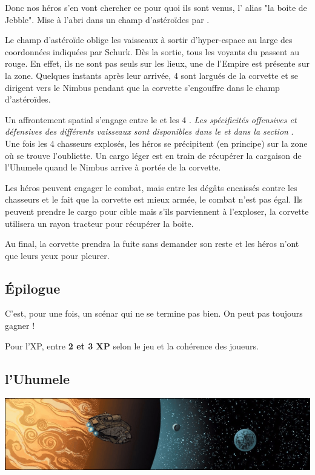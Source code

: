 Donc nos héros s’en vont chercher ce pour quoi ils sont venus, l’ alias "la boite de Jebble". Mise à l’abri dans un champ d’astéroïdes par .

Le champ d’astéroïde oblige les vaisseaux à sortir d’hyper-espace au large des coordonnées indiquées par Schurk. Dès la sortie, tous les voyants du  passent au rouge. En effet, ils ne sont pas seuls sur les lieux, une  de l’Empire est présente sur la zone. Quelques instants après leur arrivée, 4  sont largués de la corvette et se dirigent vers le Nimbus pendant que la corvette s’engouffre dans le champ d’astéroïdes.

Un affrontement spatial s’engage entre le  et les 4 . \textit{Les spécificités offensives et défensives des différents vaisseaux sont disponibles dans le  et dans la section }.\\

Une fois les 4 chasseurs explosés, les héros se précipitent (en principe) sur la zone où se trouve l’oubliette. Un cargo léger est en train de récupérer la cargaison de l’Uhumele quand le Nimbus arrive à portée de la corvette.

Les héros peuvent engager le combat, mais entre les dégâts encaissés contre les chasseurs et le fait que la corvette est mieux armée, le combat n’est pas égal. Ils peuvent prendre le cargo pour cible mais s’ils parviennent à l’exploser, la corvette utilisera un rayon tracteur pour récupérer la boite.

Au final, la corvette prendra la fuite sans demander son reste et les héros n’ont que leurs yeux pour pleurer.

\subsection{\'Epilogue}
C’est, pour une fois, un scénar qui ne se termine pas bien. On peut pas toujours gagner !

Pour l’XP, entre \textbf{2 et 3 XP} selon le jeu et la cohérence des joueurs.

\clearpage
\subsection{l’Uhumele}\label{sec:uhumele}
\noindent\includegraphics[width=\textwidth]{_img/uhumele-pano.png}
\\

